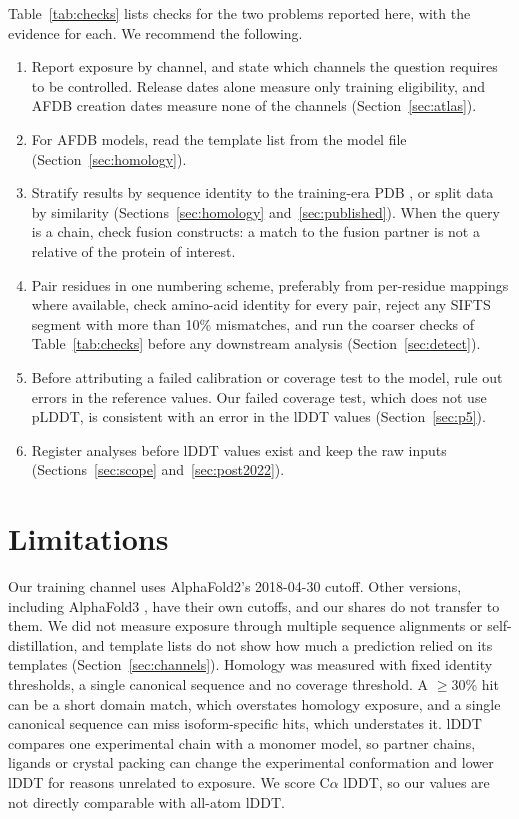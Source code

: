 \documentclass{article}
\begin{document}
Table~\ref{tab:checks} lists checks for the two problems reported here, with
the evidence for each. We recommend the following.
\begin{enumerate}\setlength{\itemsep}{1pt}
\item Report exposure by channel, and state which channels the question
      requires to be controlled. Release dates alone measure only training
      eligibility, and AFDB creation dates measure none of the channels
      (Section~\ref{sec:atlas}).
\item For AFDB models, read the template list from the model file
      (Section~\ref{sec:homology}).
\item Stratify results by sequence identity to the training-era PDB
      \citep{buttenschoen2024}, or split data by similarity
      \citep{joeres2025datasail} (Sections~\ref{sec:homology}
      and~\ref{sec:published}). When the query is a chain, check fusion
      constructs: a match to the fusion partner is not a relative of the
      protein of interest.
\item Pair residues in one numbering scheme, preferably from per-residue mappings where available, check amino-acid identity for every pair, reject any SIFTS segment with more than 10\% mismatches,
      and run the coarser checks of Table~\ref{tab:checks} before any
      downstream analysis (Section~\ref{sec:detect}).
\item Before attributing a failed calibration or coverage test to the model,
      rule out errors in the reference values. Our failed coverage test,
      which does not use pLDDT, is consistent with an error in the lDDT values
      (Section~\ref{sec:p5}).
\item Register analyses before lDDT values exist and keep the raw inputs
      (Sections~\ref{sec:scope} and~\ref{sec:post2022}).
\end{enumerate}

\section{Limitations}
\label{sec:limitations}

Our training channel uses AlphaFold2's 2018-04-30 cutoff. Other versions,
including AlphaFold3 \citep{abramson2024}, have their own cutoffs, and our
shares do not transfer to them. We did not measure exposure through multiple
sequence alignments or self-distillation, and template lists do not show how
much a prediction relied on its templates (Section~\ref{sec:channels}). Homology was measured with fixed identity
thresholds, a single canonical sequence and no coverage threshold. A
$\ge$30\% hit can be a short domain match, which overstates homology
exposure, and a single canonical sequence can miss isoform-specific hits,
which understates it. lDDT compares one experimental chain with a
monomer model, so partner chains, ligands or crystal packing can change the
experimental conformation and lower lDDT for reasons unrelated to
exposure. We score C$\alpha$ lDDT, so our values are
not directly comparable with all-atom lDDT.
\end{document}

